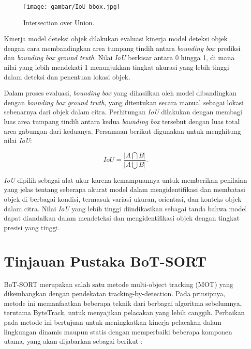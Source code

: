 \begin{figure}[H]
  \centering
  \texttt{[image: gambar/IoU bbox.jpg]}
  \caption{Intersection over Union.}
  \label{fig:IoU bbox}
\end{figure}

Kinerja model deteksi objek dilakukan evaluasi kinerja model deteksi objek dengan cara membandingkan area tumpang tindih antara \emph{bounding box} prediksi dan \emph{bounding box} \emph{ground truth}. Nilai \emph{IoU} berkisar antara 0 hingga 1, di mana nilai yang lebih mendekati 1 menunjukkan tingkat akurasi yang lebih tinggi dalam deteksi dan penentuan lokasi objek.

Dalam proses evaluasi, \emph{bounding box} yang dihasilkan oleh model dibandingkan dengan \emph{bounding box ground truth}, yang ditentukan secara manual sebagai lokasi sebenarnya dari objek dalam citra. Perhitungan \emph{IoU} dilakukan dengan membagi luas area tumpang tindih antara kedua \emph{bounding box} tersebut dengan luas total area gabungan dari keduanya. Persamaan berikut digunakan untuk menghitung nilai \emph{IoU}: 

\begin{equation}
  IoU = \frac{\left |A\bigcap B  \right |}{\left | A\bigcup B \right |}.
\end{equation}

\emph{IoU} dipilih sebagai alat ukur karena kemampuannya untuk memberikan penilaian yang jelas tentang seberapa akurat model dalam mengidentifikasi dan membatasi objek di berbagai kondisi, termasuk variasi ukuran, orientasi, dan konteks objek dalam citra. Nilai \emph{IoU} yang lebih tinggi diindikasikan sebagai tanda bahwa model dapat diandalkan dalam mendeteksi dan mengidentifikasi objek dengan tingkat presisi yang tinggi.

\section{Tinjauan Pustaka BoT-SORT}

BoT-SORT merupakan salah satu metode multi-object tracking (MOT) yang dikembangkan dengan pendekatan tracking-by-detection. Pada prinsipnya, metode ini memanfaatkan beberapa teknik dari berbagai algoritma sebelumnya, terutama ByteTrack, untuk menyajikan pelacakan yang lebih canggih. Perbaikan pada metode ini bertujuan untuk meningkatkan kinerja pelacakan dalam lingkungan dinamis maupun statis dengan memperbaiki beberapa komponen utama, yang akan dijabarkan sebagai berikut \parencite{aharon2022botsortrobustassociationsmultipedestrian}:

